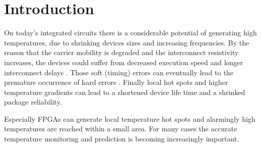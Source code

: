  
\chapter{Introduction}
\label{ch:intro}

On today's integrated circuits there is a considerable potential of generating high temperatures, 
due to shrinking devices sizes and increasing frequencies. By the reason that the carrier mobility 
is degraded and the interconnect resistivity increases, the devices could suffer from decreased 
execution speed and longer interconnect delays \cite{Huang2006}. Those soft (timing) errors can 
eventually lead to the premature occurrence of hard errors \cite{Borkar2005}. Finally local hot 
spots and higher temperature gradients can lead to a shortened device life time and a shrinked 
package reliability.


Especially FPGAs can generate local 
temperature hot spots and alarmingly high temperatures are reached within a small area. For many 
cases the accurate temperature monitoring and prediction is becoming increasingly important. 